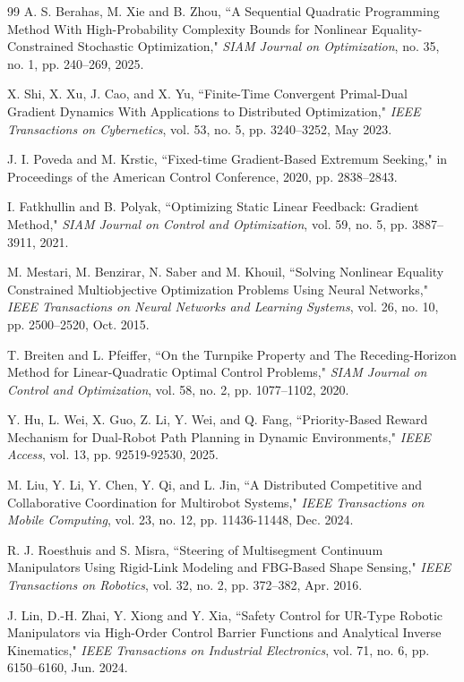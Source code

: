 \documentclass[fleqn,10pt]{wlscirep}
\begin{document}
\begin{thebibliography}{99}
 A. S. Berahas, M. Xie and B. Zhou, ``A Sequential Quadratic Programming Method With High-Probability Complexity Bounds for Nonlinear Equality-Constrained Stochastic Optimization," \emph{SIAM Journal on Optimization}, no. 35, no. 1, pp. 240--269, 2025.


 X. Shi, X. Xu, J. Cao, and X. Yu, ``Finite-Time Convergent Primal-Dual Gradient Dynamics With Applications to Distributed Optimization," \emph{IEEE Transactions on Cybernetics}, vol. 53, no. 5, pp. 3240--3252, May 2023.

 J. I. Poveda and M. Krstic, ``Fixed-time Gradient-Based Extremum Seeking," in Proceedings of the American Control Conference, 2020, pp. 2838--2843.


 I. Fatkhullin and B. Polyak, ``Optimizing Static Linear Feedback: Gradient Method," \emph{SIAM Journal on Control and Optimization}, vol. 59, no. 5, pp. 3887--3911, 2021.

 M. Mestari, M. Benzirar, N. Saber and M. Khouil, ``Solving Nonlinear Equality Constrained Multiobjective Optimization Problems Using Neural Networks," \emph{IEEE Transactions on Neural Networks and Learning Systems}, vol. 26, no. 10, pp. 2500--2520, Oct. 2015.


 T. Breiten and L. Pfeiffer, ``On the Turnpike Property and The Receding-Horizon Method for Linear-Quadratic Optimal Control Problems," \emph{SIAM Journal on Control and Optimization}, vol. 58, no. 2, pp. 1077--1102, 2020.


 Y. Hu, L. Wei, X. Guo, Z. Li, Y. Wei, and Q. Fang, ``Priority-Based Reward Mechanism for Dual-Robot Path Planning in Dynamic Environments," \emph{IEEE Access}, vol. 13, pp. 92519-92530, 2025.

  M. Liu, Y. Li, Y. Chen, Y. Qi, and L. Jin, ``A Distributed Competitive and Collaborative Coordination for Multirobot Systems," \emph{IEEE Transactions on Mobile Computing}, vol. 23, no. 12, pp. 11436-11448, Dec. 2024.


 R. J. Roesthuis and S. Misra, ``Steering of Multisegment Continuum Manipulators Using Rigid-Link Modeling and FBG-Based Shape Sensing," \emph{IEEE Transactions on Robotics}, vol. 32, no. 2, pp. 372--382, Apr. 2016.

 J. Lin, D.-H. Zhai, Y. Xiong and Y. Xia, ``Safety Control for UR-Type Robotic Manipulators via High-Order Control Barrier Functions and Analytical Inverse Kinematics,"  \emph{IEEE Transactions on Industrial Electronics}, vol. 71, no. 6, pp. 6150--6160, Jun. 2024.


\end{thebibliography}
\end{document}
